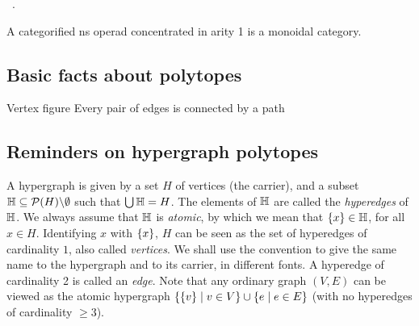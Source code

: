 \begin{definition}
\begin{center}
{  } \quad \ .
\end{center}
\end{definition}

A categorified ns operad concentrated in arity 1 is a monoidal category.




\subsection{Basic facts about polytopes}

Vertex figure
Every pair of edges is connected by a path

\subsection{Reminders on hypergraph polytopes}

A hypergraph is given by a set  $H$ of vertices (the carrier), and a subset 
${\mathbb H}\subseteq {\mathcal{P}}(H)\backslash\emptyset$ such that $\bigcup {\mathbb H}=H$.
 The elements of ${\mathbb H}$ are called the {\em hyperedges} of ${\mathbb H}$.  
 We always assume that ${\mathbb H}$ is {\em atomic}, by which we mean that 
 $\left\{x\right\}\in {\mathbb H}$, for all $x\in H$. 
 Identifying $x$ with $\left\{x\right\}$, $H$ can be seen as the set of  hyperedges of 
 cardinality $1$, also called {\em vertices}. We shall use the convention to 
 give the same name to the hypergraph and to its carrier, in different fonts. 
A hyperedge of cardinality 2 is called an {\em edge}.  Note that any ordinary graph $(V,E)$ can be viewed as the atomic hypergraph
$\left\{\left\{v\right\} \mid v\in V\right\} \cup \left\{e \mid e\in E\right\}$ (with no hyperedges of cardinality $\geq 3$). 

